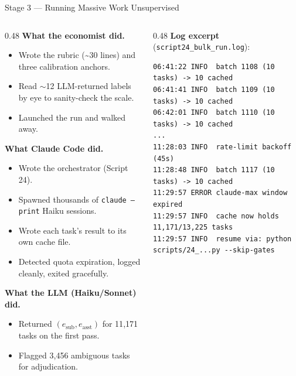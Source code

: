 \documentclass[10pt,english,aspectratio=169]{beamer}
\begin{document}
\begin{frame}[fragile]{Stage 3 --- Running Massive Work Unsupervised}
\begin{columns}[T]
\begin{column}{0.48\textwidth}
\textbf{What the economist did.}
\begin{itemize}\scriptsize
  \item Wrote the rubric (\textasciitilde{}30 lines) and three calibration anchors.
  \item Read $\sim$12 LLM-returned labels by eye to sanity-check the scale.
  \item Launched the run and walked away.
\end{itemize}

\vspace{0.15cm}
\textbf{What Claude Code did.}
\begin{itemize}\scriptsize
  \item Wrote the orchestrator (Script 24).
  \item Spawned thousands of \texttt{claude --print} Haiku sessions.
  \item Wrote each task's result to its own cache file.
  \item Detected quota expiration, logged cleanly, exited gracefully.
\end{itemize}

\vspace{0.15cm}
\textbf{What the LLM (Haiku/Sonnet) did.}
\begin{itemize}\scriptsize
  \item Returned $(e_{\text{sub}}, e_{\text{asst}})$ for 11{,}171 tasks on the first pass.
  \item Flagged 3{,}456 ambiguous tasks for adjudication.
\end{itemize}
\end{column}
\begin{column}{0.48\textwidth}
\textbf{Log excerpt} (\texttt{script24\_bulk\_run.log}):
\begin{tcolorbox}[colback=gray!5,colframe=gray!40]
\begin{lstlisting}[style=pythonstyle,numbers=none,basicstyle=\ttfamily\tiny,language={}]
06:41:22 INFO  batch 1108 (10 tasks) -> 10 cached
06:41:41 INFO  batch 1109 (10 tasks) -> 10 cached
06:42:01 INFO  batch 1110 (10 tasks) -> 10 cached
...
11:28:03 INFO  rate-limit backoff (45s)
11:28:48 INFO  batch 1117 (10 tasks) -> 10 cached
11:29:57 ERROR claude-max window expired
11:29:57 INFO  cache now holds 11,171/13,225 tasks
11:29:57 INFO  resume via: python scripts/24_...py --skip-gates
\end{lstlisting}
\end{tcolorbox}


\end{column}
\end{columns}
\end{frame}
\end{document}
